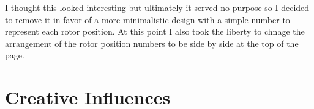 \documentclass[12pt,a4paper]{article}
\begin{document}
		\begin{center}
			\par
		\end{center}

		I thought this looked interesting but ultimately it served no purpose so I decided to 
		remove it in favor of a more minimalistic design with a simple number to represent 
		each rotor position. At this point I also took the liberty to chnage the arrangement of 
		the rotor position numbers to be side by side at the top of the page.\\

		\begin{center}
			\par
		\end{center}
	
	\newpage

	\section{Creative Influences}
\end{document}
